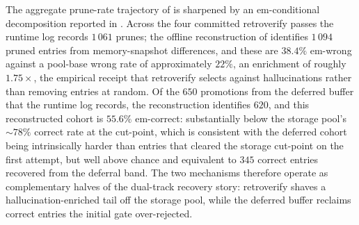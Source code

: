 

The aggregate prune-rate trajectory of  is sharpened by an em-conditional decomposition reported in . Across the four committed retroverify passes the runtime log records $1\,061$ prunes; the offline reconstruction of  identifies $1\,094$ pruned entries from memory-snapshot differences, and these are $38.4\%$ em-wrong against a pool-base wrong rate of approximately $22\%$, an enrichment of roughly $1.75\times$, the empirical receipt that retroverify selects against hallucinations rather than removing entries at random. Of the $650$ promotions from the deferred buffer that the runtime log records, the reconstruction identifies $620$, and this reconstructed cohort is $55.6\%$ em-correct: substantially below the storage pool's $\sim 78\%$ correct rate at the cut-point, which is consistent with the deferred cohort being intrinsically harder than entries that cleared the storage cut-point on the first attempt, but well above chance and equivalent to $345$ correct entries recovered from the deferral band. The two mechanisms therefore operate as complementary halves of the dual-track recovery story: retroverify shaves a hallucination-enriched tail off the storage pool, while the deferred buffer reclaims correct entries the initial gate over-rejected.



